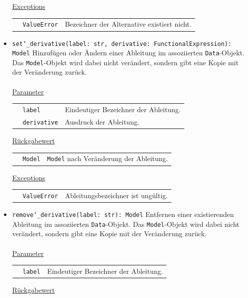 \documentclass{article}
\begin{document}
\begin{itemize}
\underline{Exceptions}\\
\begin{tabular}{lll}
 & \texttt{ValueError} & Bezeichner der Alternative existiert nicht.\\
\end{tabular}


\item \texttt{set\char`_derivative(label: str, derivative: FunctionalExpression): Model} \newline Hinzufügen oder Ändern einer Ableitung im assoziierten \texttt{Data}-Objekt. Das \texttt{Model}-Objekt wird dabei nicht verändert, sondern gibt eine Kopie mit der Veränderung zurück.
\\\\
\underline{{Parameter}}

\begin{tabular}{lll}
 & \texttt{label} & Eindeutiger Bezeichner der Ableitung. \\
 & \texttt{derivative} & Ausdruck der Ableitung. \\
\end{tabular}

\underline{{Rückgabewert}}

\begin{tabular}{lll}
 & \texttt{Model} & \texttt{Model} nach Veränderung der Ableitung. \\
\end{tabular}

\underline{Exceptions}\\
\begin{tabular}{lll}
 & \texttt{ValueError} & Ableitungsbezeichner ist ungültig.\\
\end{tabular}


\item \texttt{remove\char`_derivative(label: str): Model} \newline Entfernen einer existierenden Ableitung im assoziierten \texttt{Data}-Objekt. Das \texttt{Model}-Objekt wird dabei nicht verändert, sondern gibt eine Kopie mit der Veränderung zurück.
\\\\
\underline{{Parameter}}

\begin{tabular}{lll}
 & \texttt{label} & Eindeutiger Bezeichner der Ableitung. \\
\end{tabular}

\underline{{Rückgabewert}}


\end{itemize}
\end{document}
